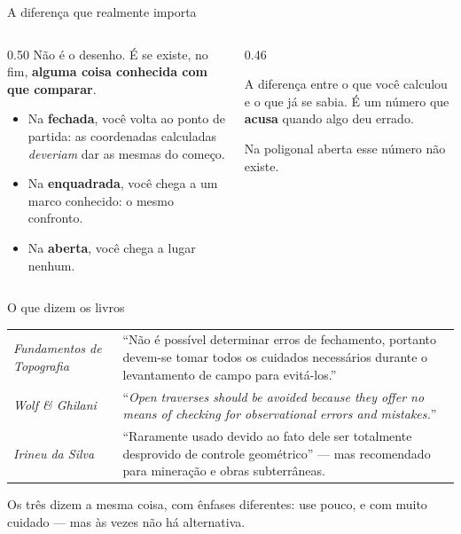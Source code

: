 \documentclass[aspectratio=169,11pt]{beamer}
\newcommand{\bnum}[1]{\textbf{\textcolor{mTeal}{#1}}}
\begin{document}
\begin{frame}{A diferença que realmente importa}
  \begin{columns}[T]
    \begin{column}{0.50\textwidth}
      Não é o desenho. É se existe, no fim, \bnum{alguma coisa conhecida com que comparar}.
      \medskip
      \begin{itemize}
        \item Na \textbf{fechada}, você volta ao ponto de partida: as coordenadas calculadas
              \emph{deveriam} dar as mesmas do começo.
        \item Na \textbf{enquadrada}, você chega a um marco conhecido: o mesmo confronto.
        \item Na \textbf{aberta}, você chega \alert{a lugar nenhum}.
      \end{itemize}
    \end{column}
    \begin{column}{0.46\textwidth}
      \begin{ideia}[title={Erro de fechamento}]
        A diferença entre o que você calculou e o que já se sabia. É um número que
        \bnum{acusa} quando algo deu errado.
        \medskip

        Na poligonal aberta esse número \alert{não existe}.
      \end{ideia}
    \end{column}
  \end{columns}
\end{frame}

\begin{frame}{O que dizem os livros}
  \centering
  \small
  \renewcommand{\arraystretch}{1.4}
  \begin{tabular}{lp{8.4cm}}
    \toprule
    \emph{Fundamentos de Topografia} &
      ``Não é possível determinar erros de fechamento, portanto devem-se tomar todos os
      cuidados necessários durante o levantamento de campo para evitá-los.'' \\
    \emph{Wolf \& Ghilani} &
      ``\emph{Open traverses should be avoided because they offer no means of checking for
      observational errors and mistakes.}'' \\
    \emph{Irineu da Silva} &
      ``Raramente usado devido ao fato dele ser totalmente desprovido de controle
      geométrico'' --- mas recomendado para mineração e obras subterrâneas. \\
    \bottomrule
  \end{tabular}
  \bigskip

  Os três dizem a mesma coisa, com ênfases diferentes: \alert{use pouco, e com muito
  cuidado} --- mas às vezes não há alternativa.
\end{frame}
\end{document}
